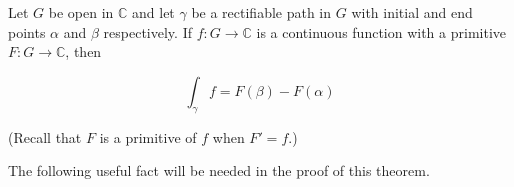 Let $G$ be open in $\mathbb{C}$ and let $\gamma$ be a rectifiable path in $G$ with initial and end points $\alpha$ and $\beta$ respectively. If $f: G \to \mathbb{C}$ is a continuous function with a primitive $F: G \to \mathbb{C}$, then

$$\int_{\gamma} f = F(\beta) - F(\alpha)$$

(Recall that $F$ is a primitive of $f$ when $F' = f$.)

The following useful fact will be needed in the proof of this theorem.